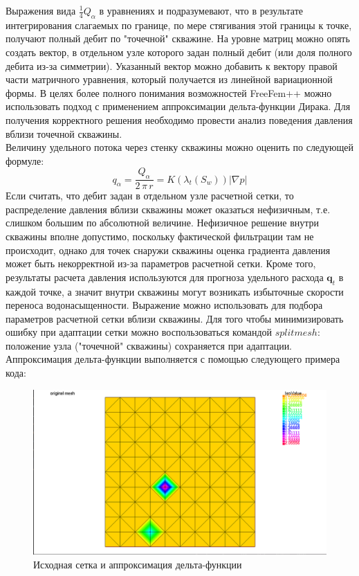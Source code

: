 Выражения вида $\frac{1}{4}Q_{\alpha}$ в уравнениях  и  подразумевают,
что в результате интегрирования слагаемых по границе, по мере стягивания этой границы к точке, получают полный дебит по "точечной" скважине.
На уровне матриц можно опять создать вектор, в отдельном узле которого задан полный дебит (или доля полного дебита из-за симметрии).
Указанный вектор можно добавить к вектору правой части матричного уравнения, который получается из линейной вариационной формы.
В целях более полного понимания возможностей FreeFem++ можно использовать подход с применением аппроксимации дельта-функции Дирака.
Для получения корректного решения необходимо провести анализ поведения давления вблизи точечной скважины.\\ 
Величину удельного потока
через стенку скважины можно оценить по следующей формуле:
\begin{equation}\label{eq:well_flowrate}
	\mathit{q}_\alpha=\frac{Q_\alpha}{2\,\pi\,r}= K (\lambda_t(S_w))|\nabla p|
\end{equation}
Если считать, что дебит задан в отдельном узле расчетной сетки, то распределение давления вблизи скважины может
оказаться нефизичным, т.е. слишком большим по абсолютной величине. Нефизичное решение внутри скважины вполне допустимо,
поскольку фактической фильтрации там не происходит, однако для точек снаружи скважины оценка градиента давления 
может быть некорректной из-за параметров расчетной сетки. Кроме того, результаты расчета давления используются
для прогноза удельного расхода $\mathbf{q}_t$ в каждой точке, а значит внутри скважины могут возникать избыточные
скорости переноса водонасыщенности. Выражение  можно использовать
для подбора параметров расчетной сетки вблизи скважины. Для того чтобы минимизировать ошибку при адаптации сетки
можно воспользоваться командой $splitmesh$: положение узла ("точечной" скважины) сохраняется при адаптации. Аппроксимация
дельта-функции выполняется с помощью следующего примера кода:

\begin{figure}[H]
	\centering
	\includegraphics[width=0.7\linewidth]{img/origMesh.png}
	\caption{Исходная сетка и аппроксимация дельта-функции}
	\label{fig:Original}
\end{figure}
